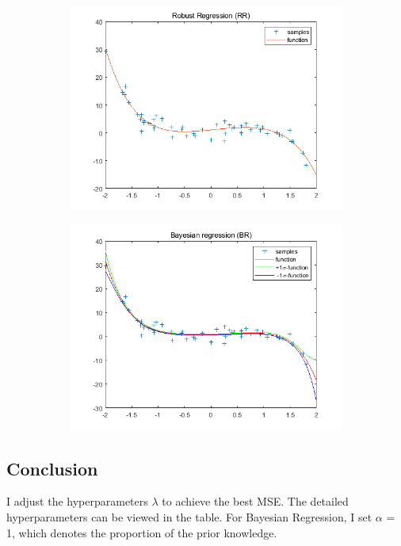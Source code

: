 \documentclass{article}
\begin{document}
\begin{figure}[H]
\begin{subfigure}[b]{0.475\textwidth}
        \includegraphics[width=\textwidth]{fig/1b-rr.png} 
    \end{subfigure}
    \quad
    \begin{subfigure}[b]{0.475\textwidth}   
        \centering 
        \includegraphics[width=\textwidth]{fig/1b-br.png} 
    \end{subfigure}
\end{figure}

\subsection*{Conclusion}
I adjust the hyperparameters $\lambda$ to achieve the best MSE. The detailed hyperparameters can be viewed in the table. For Bayesian Regression, I set $\alpha$ = 1, which denotes the proportion of the prior knowledge.
\end{document}
